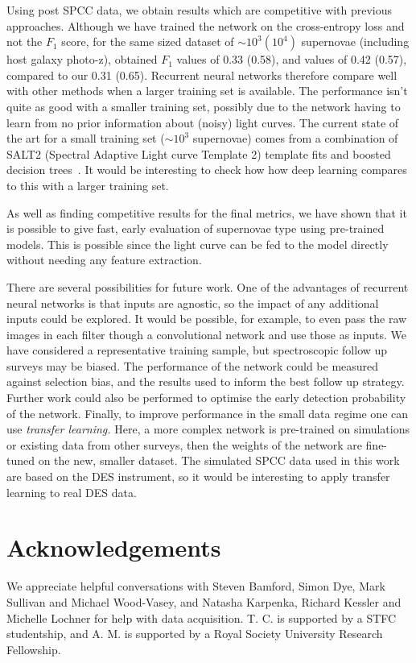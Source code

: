\documentclass[nofootinbib,amsmath,amssymb,10pt,eqsecnum, twocolumn]{revtex4-1}
\begin{document}
Using post SPCC data, we obtain results which are competitive with previous approaches.  Although we have trained the network on the cross-entropy loss  and not the $F_1$ score, for the same sized dataset of $\sim10^3 (10^4)$ supernovae (including host galaxy photo-z), \cite{Karpenka:2012pm} obtained $F_1$ values of 0.33 (0.58), and \cite{Newling:2010bp} values of 0.42 (0.57), compared to our  0.31 (0.65). Recurrent neural networks  therefore compare well with other methods when a larger training  set is available. The performance isn't  quite as good with a smaller training set, possibly due to the network having to learn from no prior information about (noisy) light curves. The current state of the art for a small training set  ($\sim10^3$ supernovae) comes from a combination of SALT2 (Spectral Adaptive Light curve Template 2) template fits and boosted decision trees~\cite{Lochner:2016hbn}. It would be interesting to check how how deep learning compares to this with a larger training set. 

As well as finding competitive results for the final metrics, we have shown that it is possible to give fast, early evaluation of supernovae type using pre-trained models. This is possible since the light curve can be fed to the model directly without needing any feature extraction.  

There are several possibilities for future work. One of the advantages of recurrent neural networks is that inputs are agnostic, so the impact of any additional inputs could be explored. It would be possible, for example, to even pass the raw images in each filter though a convolutional network and use those as inputs. We have considered a representative training sample, but spectroscopic follow up surveys may be biased. The performance of the network could be measured against selection bias, and the results used to inform the best follow up strategy.  Further work could also be performed to optimise the early detection probability of the network.  Finally, to improve performance in the small data regime one can use {\em transfer learning.} Here, a more complex network is pre-trained on simulations or existing data from other surveys, then the weights of the network are fine-tuned on the new, smaller dataset. The simulated SPCC data used in this work are based on the DES instrument, so it would be interesting to apply transfer learning to real DES data. 

\section*{Acknowledgements}

We appreciate helpful conversations with Steven Bamford, Simon Dye, Mark Sullivan and Michael Wood-Vasey, and Natasha Karpenka, Richard Kessler and Michelle Lochner for help with data acquisition. T. C. is supported by a STFC studentship, and A. M. is supported by a Royal Society University Research Fellowship.


\end{document}
